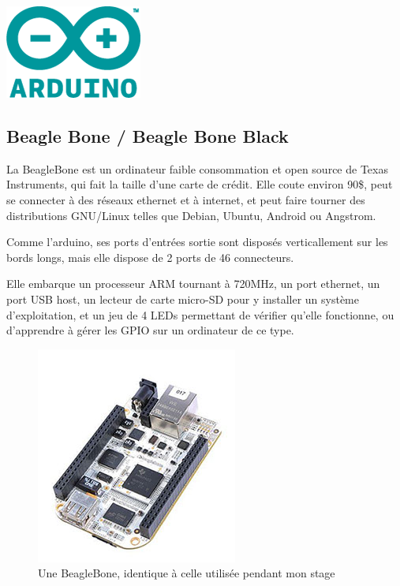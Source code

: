 \documentclass{article}
\begin{document}
\begin{center}
    \includegraphics{img/logo.png}
\end{center}

\clearpage

\subsection{Beagle Bone / Beagle Bone Black}
\label{bbb}

La BeagleBone est un ordinateur faible consommation et open source de Texas Instruments, qui fait la taille d’une carte de crédit. Elle coute environ 90\$, peut se connecter à des réseaux ethernet et à internet, et peut faire tourner des distributions GNU/Linux telles que Debian, Ubuntu, Android ou Angstrom.

Comme l’arduino, ses ports d’entrées sortie sont disposés verticallement sur les bords longs, mais elle dispose de 2 ports de 46 connecteurs.

Elle embarque un processeur ARM tournant à 720MHz, un port ethernet, un port USB host, un lecteur de carte micro-SD pour y installer un système d’exploitation, et un jeu de 4 LEDs permettant de vérifier qu’elle fonctionne, ou d’apprendre à gérer les GPIO sur un ordinateur de ce type.

\begin{figure}[h!]
    \centering\includegraphics[width=\linewidth/2]{img/bb.jpg}
    \caption{Une BeagleBone, identique à celle utilisée pendant mon stage}
\end{figure}
\end{document}
